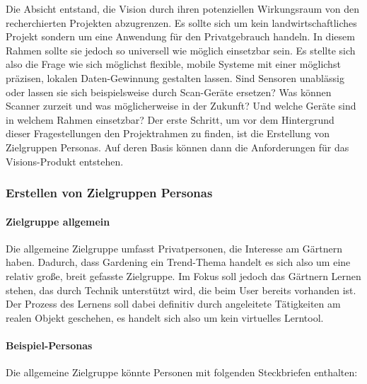Die Absicht entstand, die Vision durch ihren potenziellen Wirkungsraum
von den recherchierten Projekten abzugrenzen. Es sollte sich um kein
landwirtschaftliches Projekt sondern um eine Anwendung für den
Privatgebrauch handeln. In diesem Rahmen sollte sie jedoch so universell
wie möglich einsetzbar sein. Es stellte sich also die Frage wie sich
möglichst flexible, mobile Systeme mit einer möglichst präzisen, lokalen
Daten-Gewinnung gestalten lassen. Sind Sensoren unablässig oder lassen
sie sich beispielsweise durch Scan-Geräte ersetzen? Was können Scanner
zurzeit und was möglicherweise in der Zukunft? Und welche Geräte sind in
welchem Rahmen einsetzbar? Der erste Schritt, um vor dem Hintergrund
dieser Fragestellungen den Projektrahmen zu finden, ist die Erstellung
von Zielgruppen Personas. Auf deren Basis können dann die Anforderungen
für das Visions-Produkt entstehen.

\hypertarget{erstellen-von-zielgruppen-personas}{%
\subsubsection{Erstellen von Zielgruppen
Personas}\label{erstellen-von-zielgruppen-personas}}

\hypertarget{zielgruppe-allgemein}{%
\paragraph{Zielgruppe allgemein}\label{zielgruppe-allgemein}}

Die allgemeine Zielgruppe umfasst Privatpersonen, die Interesse am
Gärtnern haben. Dadurch, dass Gardening ein Trend-Thema handelt es sich
also um eine relativ große, breit gefasste Zielgruppe. Im Fokus soll
jedoch das Gärtnern Lernen stehen, das durch Technik unterstützt wird,
die beim User bereits vorhanden ist. Der Prozess des Lernens soll dabei
definitiv durch angeleitete Tätigkeiten am realen Objekt geschehen, es
handelt sich also um kein virtuelles Lerntool.

\hypertarget{beispiel-personas}{%
\paragraph{Beispiel-Personas}\label{beispiel-personas}}

Die allgemeine Zielgruppe könnte Personen mit folgenden Steckbriefen
enthalten:

